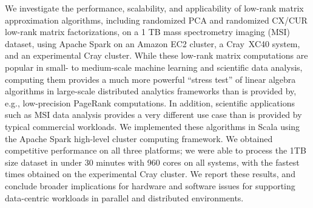 We investigate the performance, scalability, and applicability of low-rank matrix approximation algorithms, including randomized PCA and randomized CX/CUR low-rank matrix factorizations, on a 1 TB mass spectrometry imaging (MSI) dataset, using Apache Spark on an Amazon EC2 cluster, a 
Cray{\textsuperscript{\tiny\textregistered}}~XC40{\textsuperscript{\tiny\texttrademark}} system, and an experimental Cray cluster.
While these low-rank matrix computations are popular in small- to medium-scale machine learning and scientific data analysis, computing them provides a much more powerful ``stress test'' of linear algebra algorithms in large-scale distributed analytics frameworks than is provided by, e.g., low-precision PageRank computations.
In addition, scientific applications such as MSI data analysis provides a very different use case 
than is provided by typical commercial workloads.
We implemented these algorithms in Scala using the Apache Spark high-level cluster computing framework.  
We obtained competitive performance on all three platforms; we were able to process the 1TB size dataset in under 30 minutes with 960 cores on all systems, with the fastest times obtained on the experimental Cray cluster.
We report these results, and conclude broader implications for hardware and software issues for supporting data-centric workloads in parallel and distributed environments.  

